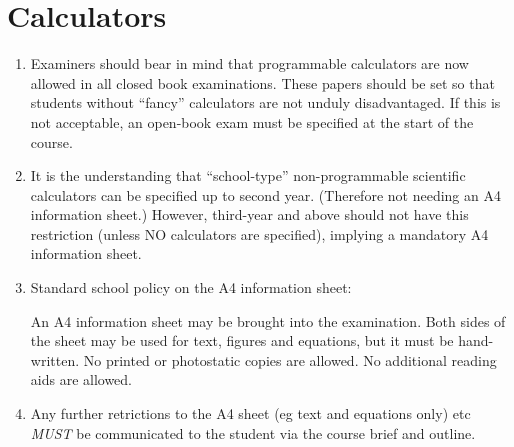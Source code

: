 \documentclass{ArcHandout}
\begin{document}
\section{Calculators}
\begin{enumerate}
  \item Examiners should bear in mind that programmable calculators are now
  allowed in all closed book examinations. These papers should be
  set so that students without ``fancy''  calculators are not unduly
  disadvantaged. If this is not acceptable, an open-book exam must be specified
  at the start of the course.

  \item It is the understanding that ``school-type'' non-programmable
  scientific calculators can be specified up to second year. (Therefore not
  needing an A4 information sheet.) However, third-year and above should
  not have this restriction (unless NO calculators are specified), implying
  a mandatory A4 information sheet.

  \item Standard school policy on the A4 information sheet:

  An A4 information sheet may be brought into the examination. Both sides
  of the sheet may be used for text, figures and equations, but it must be
  hand-written. No printed or photostatic copies are allowed. No additional
  reading aids are allowed. 

  \item Any further retrictions to the A4 sheet (eg text and equations
  only) etc \emph{MUST} be communicated to the student via the course brief
  and outline.
  
\end{enumerate}  
\end{document}

